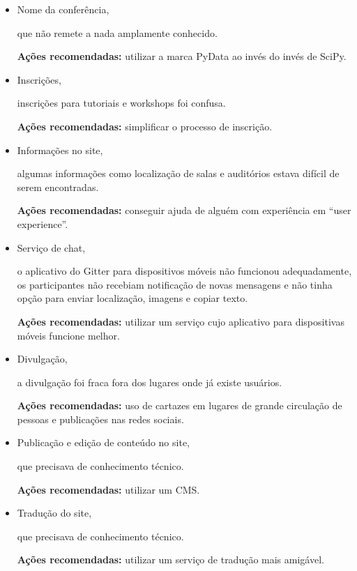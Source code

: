 \documentclass[12pt]{article}
\begin{document}
\begin{itemize}
  \item Nome da conferência,

    que não remete a nada amplamente conhecido.

    \textbf{Ações recomendadas:} utilizar a marca PyData ao invés do invés de
    SciPy.

  \item Inscrições,

    inscrições para tutoriais e workshops foi confusa.

    \textbf{Ações recomendadas:} simplificar o processo de inscrição.

  \item Informações no site,

    algumas informações como localização de salas e auditórios estava difícil de
    serem encontradas.

    \textbf{Ações recomendadas:} conseguir ajuda de alguém com experiência em
    ``user experience''.

  \item Serviço de chat,

    o aplicativo do Gitter para dispositivos móveis não funcionou adequadamente,
    os participantes não recebiam notificação de novas mensagens e não tinha
    opção para enviar localização, imagens e copiar texto.

    \textbf{Ações recomendadas:} utilizar um serviço cujo aplicativo para
    dispositivas móveis funcione melhor.

  \item Divulgação,

    a divulgação foi fraca fora dos lugares onde já existe usuários.

    \textbf{Ações recomendadas:} uso de cartazes em lugares de grande circulação
    de pessoas e publicações nas redes sociais.

  \item Publicação e edição de conteúdo no site,

    que precisava de conhecimento técnico.

    \textbf{Ações recomendadas:} utilizar um CMS.

  \item Tradução do site,

    que precisava de conhecimento técnico.

    \textbf{Ações recomendadas:} utilizar um serviço de tradução mais amigável.
\end{itemize}
\end{document}
